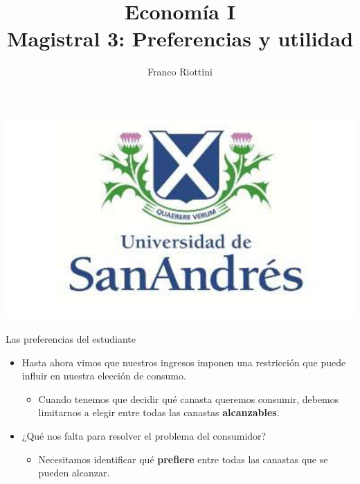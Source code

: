 \documentclass{beamer}
\title[Economía I]{Economía I \vspace{4mm}
\\ Magistral 3: Preferencias y utilidad}
\date{}
\author[Franco Riottini]{Franco Riottini}
\institute[]{Universidad de San Andrés}
\begin{document}
\begin{frame}
\titlepage
\centering
\includegraphics[scale=0.2]{../Figures/logoUDESA.jpg} 
\end{frame}

\begin{frame}{Las preferencias del estudiante}
    \begin{itemize}
        \item Hasta ahora vimos que nuestros ingresos imponen una restricción que puede influir en nuestra elección de consumo. \vspace{2mm}
        \begin{itemize}
        \item Cuando tenemos que decidir qué canasta queremos consumir, debemos limitarnos a elegir entre todas las canastas \textbf{alcanzables}.  \vspace{3mm}
        \end{itemize}
        \item ¿Qué nos falta para resolver el problema del consumidor?  \vspace{2mm}
        \begin{itemize}
        \item Necesitamos identificar qué \textbf{prefiere} entre todas las canastas que se pueden alcanzar.
        \end{itemize}
    \end{itemize}
\end{frame}
\end{document}
